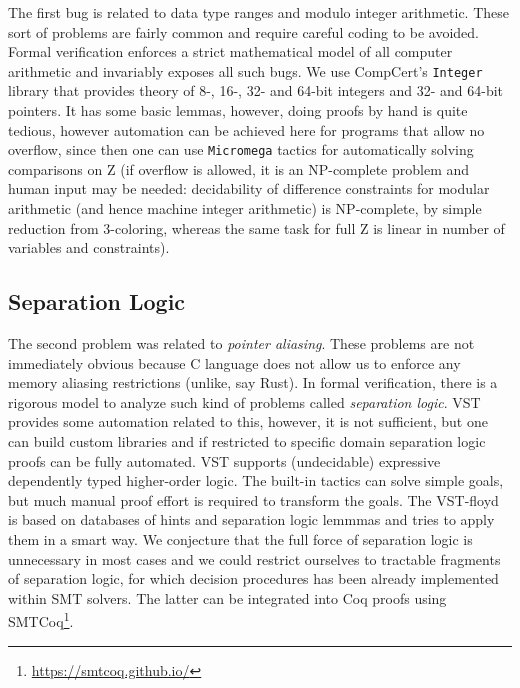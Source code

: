 \documentclass[acmsmall,nonacm]{acmart}
\begin{document}
The first bug is related to data type ranges and modulo integer
arithmetic. These sort of problems are fairly common and require
careful coding to be avoided. Formal verification enforces a strict
mathematical model of all computer arithmetic and invariably exposes
all such bugs. We use CompCert's \texttt{Integer} library that
provides theory of 8-, 16-, 32- and 64-bit integers and 32- and 64-bit
pointers. It has some basic lemmas, however, doing proofs by hand is
quite tedious, however automation can be achieved here for programs
that allow no overflow, since then one can use
\texttt{Micromega}
tactics for automatically solving comparisons on Z (if overflow is
allowed, it is an NP-complete problem and human input may be needed:
decidability of difference constraints for modular arithmetic (and
hence machine integer arithmetic) is NP-complete, by simple reduction
from 3-coloring\cite{PointerConstraintsNP}, whereas the same task for
full Z is linear in number of variables and constraints).


\subsection{Separation Logic}

The second problem was related to \textit{pointer aliasing}. These problems are not immediately obvious because C language does not allow us to enforce any memory aliasing restrictions (unlike, say Rust). In formal verification, there is a rigorous model to analyze such kind of problems called \textit{separation logic}. VST provides some automation related to this, however, it is not sufficient, but one can build custom libraries and if restricted to specific domain separation logic proofs can be fully automated. VST supports (undecidable) expressive dependently typed higher-order logic. The built-in tactics can solve simple goals, but much manual proof effort is required to transform the goals. The VST-floyd is based on databases of hints and separation logic lemmmas and tries to apply them in a smart way. We conjecture that the full force of separation logic is unnecessary in most cases and we could restrict ourselves to tractable fragments of separation logic, for which decision procedures has been already implemented within SMT solvers. The latter can be integrated into Coq proofs using SMTCoq\footnote{\url{https://smtcoq.github.io/}}.

 


\end{document}
